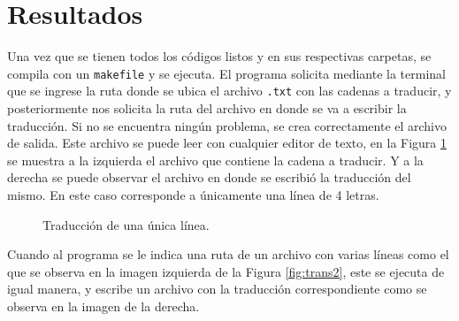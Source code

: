 \section{Resultados}

Una vez que se tienen todos los códigos listos y en sus respectivas carpetas, se compila con un \texttt{makefile} y se ejecuta. El programa solicita mediante la terminal que se ingrese la ruta donde se ubica el archivo \texttt{.txt} con las cadenas a traducir, y posteriormente nos solicita la ruta del archivo en donde se va a escribir la traducción. Si no se encuentra ningún problema, se crea correctamente el archivo de salida. Este archivo se puede leer con cualquier editor de texto, en la Figura \ref{fig:trans1} se muestra a la izquierda el archivo que contiene la cadena a traducir. Y a la derecha se puede observar el archivo en donde se escribió la traducción del mismo. En este caso corresponde a únicamente una línea de 4 letras. 

\begin{figure}[htbp]
\centering
{}
\caption{Traducción de una única línea.} \label{fig:trans1}
\end{figure}

Cuando al programa se le indica una ruta de un archivo con varias líneas como el que se observa en la imagen izquierda de la Figura \ref{fig:trans2}, este se ejecuta de igual manera, y escribe un archivo con la traducción correspondiente como se observa en la imagen de la derecha.

